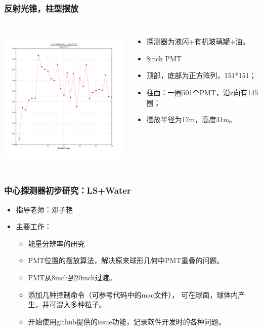 \begin{frame}
    \frametitle{反射光锥，柱型摆放}
    \begin{columns}
        \column{7.0cm} 
            \includegraphics[height=7cm, keepaspectratio]{data/tube_full_random.png}
        \column{4.0cm} 
            \begin{itemize}
                \item 探测器为液闪+有机玻璃罐+油。
                \item 8inch PMT
                \item 顶部，底部为正方阵列，151*151；
                \item 柱面：一圈501个PMT，沿z向有145圈；
                \item 摆放半径为17m，高度31m。
            \end{itemize}
    \end{columns}
\end{frame}

\begin{frame}
    \frametitle{中心探测器初步研究：LS+Water}
    \begin{itemize}
        \item 指导老师：邓子艳
        \item 主要工作：
            \begin{itemize}
                \item 能量分辨率的研究
                \item PMT位置的摆放算法，解决原来球形几何中PMT重叠的问题。
                \item PMT从8inch到20inch过渡。
                \item 添加几种控制命令（可参考代码中的mac文件），
                      可在球面，球体内产生，并可混入多种粒子。
                \item 开始使用github提供的issue功能，记录软件开发时的各种问题。
            \end{itemize}
    \end{itemize}
\end{frame}

